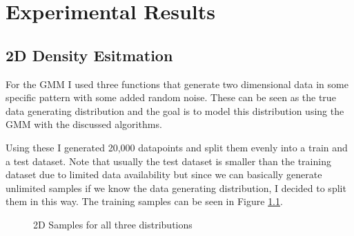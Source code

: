\chapter{Experimental Results}
\label{cha:experimental_results}

\section{2D Density Esitmation}

For the GMM I used three functions that generate two dimensional data in some specific pattern with some added random noise. These 
can be seen as the true data generating distribution and the goal is to model this distribution using the GMM with the discussed 
algorithms. 

Using these I generated 20,000 datapoints and split them evenly into a train and a test dataset. Note that usually the test dataset is smaller 
than the training dataset due to limited data availability but since we can basically generate unlimited samples if we know 
the data generating distribution, I decided to split them in this way. 
The training samples can be seen in Figure \ref{fig:2d_datasets}. \\

\begin{figure}[H]
    \centering
    \caption{2D Samples for all three distributions}
    \label{fig:2d_datasets}
\end{figure}

